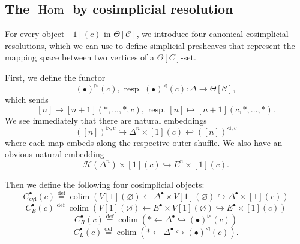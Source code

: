 \documentclass[leqno]{article}
\numberwithin{equation}{subsection}
\theoremstyle{plain}   %
\theoremstyle{remark}
\theoremstyle{plain}
\DeclareMathOperator{\colim}{colim}
\DeclareMathOperator{\Hom}{Hom}
\providecommand{\C}{}
\renewcommand{\C}{\ensuremath{\mathcal{C}}}
\newcommand{\defeq}{\overset{\mathrm{def}}=}
\begin{document}
\subsection{The \(\Hom\) by cosimplicial resolution}
For every object \([1](c)\) in \(\Theta[\C]\), we introduce four canonical cosimplicial resolutions, which we can use to define simplicial presheaves that represent the mapping space between two vertices of a \(\Theta[C]\)-set.

First, we define the functor
\[(\bullet)^{\triangleright}(c),\text{ resp. }(\bullet)^{\triangleleft}(c): \Delta \to \Theta[\C],\]
which sends
\[[n]\mapsto [n+1](\ast,\dots,\ast,c), \text{ resp. } [n]\mapsto [n+1](c,\ast,\dots,\ast).\]
We see immediately that there are natural embeddings
\[([n])^{\triangleright,c} \hookrightarrow \Delta^n \times [1](c)  \hookleftarrow ([n])^{\triangleleft,c}\]
where each map embeds along the respective outer shuffle. We also have an obvious natural embedding
\[\mathscr{H}(\Delta^n)\times [1](c) \hookrightarrow E^n\times [1](c).\]

Then we define the following four cosimplicial objects:
\[C^\bullet_{\mathrm{cyl}}(c)\defeq \colim \left( V[1](\varnothing) \leftarrow \Delta^\bullet \times V[1](\varnothing) \hookrightarrow \Delta^\bullet\times [1](c)\right)\]
\[C^\bullet_{E}(c)\defeq \colim \left( V[1](\varnothing) \leftarrow E^\bullet \times V[1](\varnothing) \hookrightarrow E^\bullet\times [1](c)\right)\]
\[C^\bullet_{R}(c)\defeq \colim \left( \ast \leftarrow \Delta^\bullet \hookrightarrow (\bullet)^\triangleright(c)\right)\]
\[C^\bullet_{L}(c)\defeq \colim \left( \ast \leftarrow \Delta^\bullet \hookrightarrow (\bullet)^\triangleleft(c)\right).\]
\end{document}
